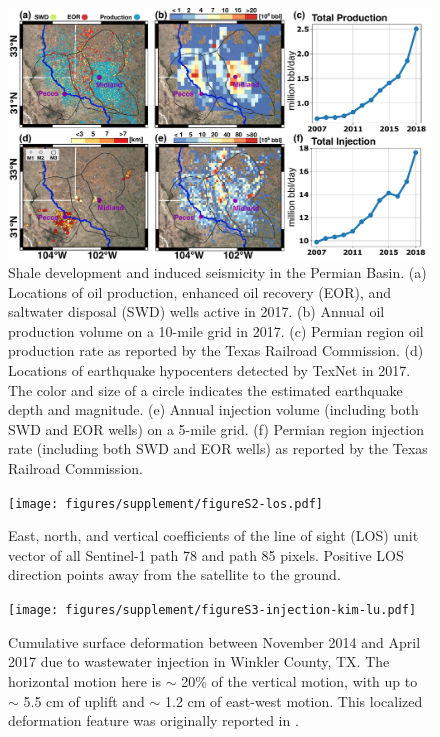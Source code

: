 \documentclass[draft,grl]{agutexSI2019}
\begin{document}
\begin{article}
\begin{figure}[hbt!]
\centering
\includegraphics[width=0.99\linewidth]{figures/supplement/figureS1-cisr-data.pdf}
\caption{Shale development and induced seismicity in the Permian Basin. (a) Locations of oil production, enhanced oil recovery (EOR), and saltwater disposal (SWD) wells active in 2017. (b) Annual oil production volume on a 10-mile grid in 2017. (c) Permian region oil production rate as reported by the Texas Railroad Commission. (d) Locations of earthquake hypocenters detected by TexNet in 2017. The color and size of a circle indicates the estimated earthquake depth and magnitude. (e) Annual injection volume (including both SWD and EOR wells) on a 5-mile grid. (f) Permian region injection rate (including both SWD and EOR wells) as reported by the Texas Railroad Commission.
}
\label{fig:Permian}
\end{figure}

\begin{figure}[!htbp]
\centering
\texttt{[image: figures/supplement/figureS2-los.pdf]}
\caption{East, north, and vertical coefficients of the line of sight (LOS) unit vector of all Sentinel-1 path 78 and path 85 pixels. Positive LOS direction points away from the satellite to the ground.}
\label{fig:los-map}
\end{figure}

\begin{figure}
\centering
\texttt{[image: figures/supplement/figureS3-injection-kim-lu.pdf]}
\caption{Cumulative surface deformation between November 2014 and April 2017 due to wastewater injection in Winkler County, TX. The horizontal motion here is $\sim$ 20\% of the vertical motion, with up to $\sim$ 5.5 cm of uplift and $\sim$ 1.2 cm of east-west motion. This localized deformation feature was originally reported in .}
\label{fig:injection-kim-lu}
\end{figure}


\end{article}
\end{document}

